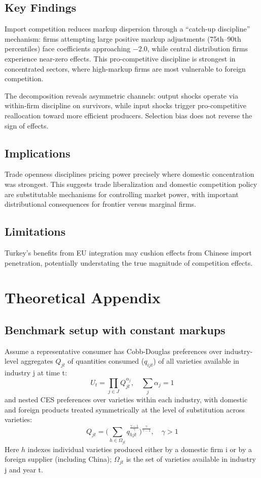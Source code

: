 \documentclass[12pt]{article}
\begin{document}
\subsection{Key Findings}

Import competition reduces markup dispersion through a ``catch-up discipline'' mechanism: firms attempting large positive markup adjustments (75th--90th percentiles) face coefficients approaching $-2.0$, while central distribution firms experience near-zero effects. This pro-competitive discipline is strongest in concentrated sectors, where high-markup firms are most vulnerable to foreign competition.

The decomposition reveals asymmetric channels: output shocks operate via within-firm discipline on survivors, while input shocks trigger pro-competitive reallocation toward more efficient producers. Selection bias does not reverse the sign of effects.

\subsection{Implications}

Trade openness disciplines pricing power precisely where domestic concentration was strongest. This suggests trade liberalization and domestic competition policy are substitutable mechanisms for controlling market power, with important distributional consequences for frontier versus marginal firms.

\subsection{Limitations}

Turkey's benefits from EU integration may cushion effects from Chinese import penetration, potentially understating the true magnitude of competition effects.

\printbibliography

\newpage
\appendix

\section{Theoretical Appendix}

\subsection{Benchmark setup with constant markups}
Assume a representative consumer has Cobb-Douglas preferences over industry-level aggregates $Q_{jt}$ of quantities consumed ($q_{ijt}$) of all varieties available in industry j at time t: 
\[
U_t = \prod_{j\in J} Q_{jt}^{\alpha_j}, \quad \sum_j \alpha_j = 1
\]
and nested CES preferences over varieties within each industry, with domestic and foreign products treated symmetrically at the level of substitution across varieties: 
\[
Q_{jt} = \Bigg( \sum_{h \in \Omega_{jt}} q_{hjt}^{\frac{\gamma-1}{\gamma}} \Bigg)^{\frac{\gamma}{\gamma-1}}, \quad \gamma>1
\]
Here $h$ indexes individual varieties produced either by a domestic firm i or by a foreign supplier (including China); $\Omega_{jt}$ is the set of varieties available in industry j and year t. 
\end{document}
